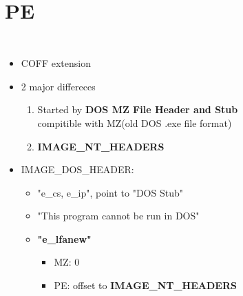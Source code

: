 
\section{PE}
\begin{frame}
    \begin{columns}[t]
        \begin{itemize}
            \item COFF extension
            \item 2 major differeces
            \begin{enumerate}
                \item Started by \textbf{DOS MZ File Header and Stub}
                    compitible with MZ(old DOS .exe file format)
                \item \textbf{IMAGE\_NT\_HEADERS}
            \end{enumerate}
            \item IMAGE\_DOS\_HEADER:
            \begin{itemize}
                \item "e\_cs, e\_ip", point to "DOS Stub"
                \item "This program cannot be run in DOS"
                \item \textbf{"e\_lfanew"}
                \begin{itemize}
                    \item MZ: 0
                    \item PE: offset to \textbf{IMAGE\_NT\_HEADERS}
                \end{itemize}
            \end{itemize}
        \end{itemize}
        \begin{figure}
            \begin{center}

\end{center}
\end{figure}
\end{columns}
\end{frame}
